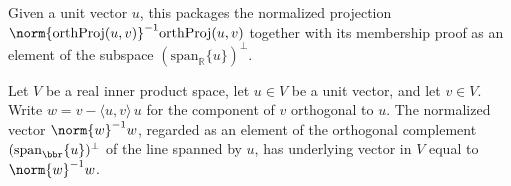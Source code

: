 \begin{definition}
\label{CodingTheory.Johnson.mkProj}
\leanok
{}
Given a unit vector $u$, this packages the normalized projection
$\norm{\mathrm{orthProj}(u,v)}^{-1}\mathrm{orthProj}(u,v)$ together with its membership
proof as an element of the subspace $(\mathrm{span}_{\mathbb{R}}\{u\})^{\perp}$.
\end{definition}

\begin{lemma}
\label{CodingTheory.Johnson.mkProj_val}
\leanok
{}
Let $V$ be a real inner product space, let $u \in V$ be a unit vector, and let $v \in
V$. Write $w = v - \langle u, v\rangle\, u$ for the component of $v$ orthogonal to $u$.
The normalized vector $\norm{w}^{-1} w$, regarded as an element of the orthogonal
complement $(\mathrm{span}_{\bbr}\{u\})^{\perp}$ of the line spanned by $u$, has
underlying vector in $V$ equal to $\norm{w}^{-1} w$.
\end{lemma}

